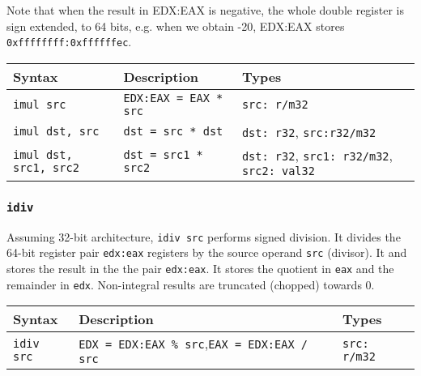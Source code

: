 \documentclass[a4paper]{article}
\begin{document}


Note that when the result in EDX:EAX is negative, the whole double register is sign extended, to 64 bits, e.g. when we obtain -20, EDX:EAX stores \texttt{0xffffffff:0xffffffec}.


\begin{tabular}{p{}p{}p{}} \toprule %
{Syntax} & {Description} & {Types} \\ \midrule
    \texttt{imul src} & {\texttt{EDX:EAX = EAX * src}} & {\texttt{src: r/m32}} \\
    
    \texttt{imul dst, src} & {\texttt{dst = src * dst}} & {\texttt{dst: r32}, \texttt{src:r32/m32}}\\
    \texttt{imul dst, src1, src2} & {\texttt{dst = src1 * src2}} & {\texttt{dst: r32},
    \texttt{src1: r32/m32}, \texttt{src2: val32}} \\ \bottomrule
\end{tabular}


\subsubsection{\texttt{idiv}}

Assuming 32-bit architecture, \texttt{idiv src} performs signed division. It divides the 64-bit register pair  \texttt{edx:eax} registers by the source operand \texttt{src} (divisor). It  and stores the result in the the pair \texttt{edx:eax}. It stores the quotient in \texttt{eax} and the remainder in \texttt{edx}. Non-integral results are truncated (chopped) towards 0.
\begin{tabular}{p{}p{}p{}} \toprule %
{Syntax} & {Description} & {Types} \\ \midrule
    \texttt{idiv src} & {\texttt{EDX = EDX:EAX \% src},\quad\quad\quad\quad\quad\quad\quad \texttt{EAX = EDX:EAX / src}} & {\texttt{src: r/m32}} \\
    \bottomrule
\end{tabular}
\end{document}
